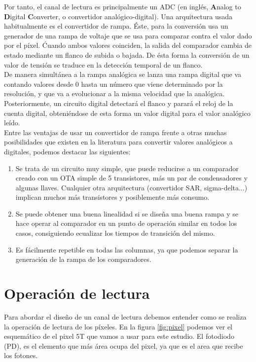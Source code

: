 Por tanto, el canal de lectura es principalmente un ADC (en inglés, \textbf{A}nalog
to \textbf{D}igital \textbf{C}onverter, o convertidor analógico-digital).
Una arquitectura usada habitualmente es el convertidor de rampa.
Éste, para la conversión usa un generador de una rampa de voltaje que se usa para
comparar contra el valor dado por el píxel. Ćuando ambos valores coinciden,
la salida del comparador cambia de estado mediante un flanco de subida o bajada.
De ésta forma la conversión de un valor de tensión se traduce en la detección temporal
de un flanco.\\

De manera simultánea a la rampa analógica se lanza una rampa digital que va contando
valores desde 0 hasta un número que viene determinado por la resolución, y que va a
evolucionar a la misma velocidad que la analógica. Posteriormente, un circuito digital
detectará el flanco y parará el reloj de la cuenta digital, obteniéndose de esta forma
un valor digital para el valor analógico leído.\\

Entre las ventajas de usar un convertidor de rampa frente a otras muchas posibilidades
que existen en la literatura para convertir valores analógicos a digitales, podemos
destacar las siguientes:\\

\begin{enumerate}
	\item Se trata de un circuito muy simple, que puede reducirse a un comparador
	creado con un OTA simple de 5 transistores, más un par de condensadores y
	algunas llaves. Cualquier otra arquitectura (convertidor SAR, sigma-delta...)
	implican muchos más transistores y posiblemente más consumo.
	\item Se puede obtener una buena linealidad si se diseña una buena rampa
	y se hace operar al comparador en un punto de operación similar en todos los casos,
	consiguiendo ecualizar los tiempos de transición del mismo.
	\item Es fácilmente repetible en todas las columnas, ya que podemos separar
	la generación de la rampa de los comparadores.
\end{enumerate}

\section{Operación de lectura}\label{cap:ro_sch_operacion}

Para abordar el diseño de un canal de lectura debemos entender como se realiza la
operación de lectura de los píxeles.
En la figura \ref{fig:pixel} podemos ver el esquemático de el pixel 5T
que vamos a usar para este estudio. El fotodiodo (PD), es el elemento que más
área ocupa del pixel, ya que es el area que recibe los fotones.

